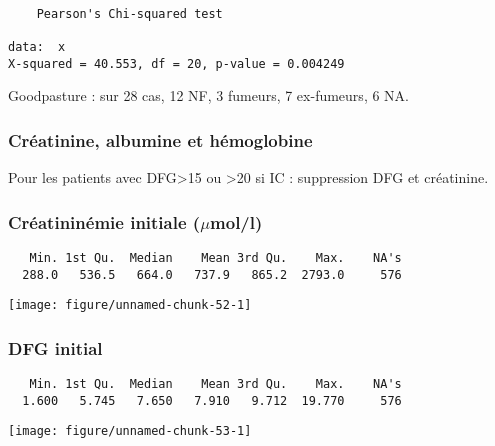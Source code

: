\documentclass[11pt,a4paper]{article}\usepackage[]{graphicx}\usepackage[]{color}
\makeatletter
\def\maxwidth{ %
  \ifdim\Gin@nat@width>\linewidth
    \linewidth
  \else
    \Gin@nat@width
  \fi
}
\newenvironment{kframe}{%
 \def\at@end@of@kframe{}%
 \ifinner\ifhmode%
  \def\at@end@of@kframe{\end{minipage}}%
  \begin{minipage}{\columnwidth}%
 \fi\fi%
 \def\FrameCommand##1{\hskip\@totalleftmargin \hskip-\fboxsep
 \colorbox{shadecolor}{##1}\hskip-\fboxsep
     \hskip-\linewidth \hskip-\@totalleftmargin \hskip\columnwidth}%
 \MakeFramed {\advance\hsize-\width
   \@totalleftmargin\z@ \linewidth\hsize
   \@setminipage}}%
 {\par\unskip\endMakeFramed%
 \at@end@of@kframe}
\newenvironment{knitrout}{}{} %
\makeatother
\begin{document}
\begin{knitrout}
\color{fgcolor}\begin{kframe}
\begin{verbatim}

	Pearson's Chi-squared test

data:  x
X-squared = 40.553, df = 20, p-value = 0.004249
\end{verbatim}
\end{kframe}
\end{knitrout}

Goodpasture : sur 28 cas, 12 NF, 3 fumeurs, 7 ex-fumeurs, 6 NA.


    \subsubsection{Créatinine, albumine et hémoglobine}

Pour les patients avec DFG\textgreater15 ou \textgreater20 si IC : suppression DFG et créatinine.

\subsubsection*{Créatininémie initiale ($\mu$mol/l)}

\begin{knitrout}
\color{fgcolor}\begin{kframe}
\begin{verbatim}
   Min. 1st Qu.  Median    Mean 3rd Qu.    Max.    NA's 
  288.0   536.5   664.0   737.9   865.2  2793.0     576 
\end{verbatim}
\end{kframe}
\texttt{[image: figure/unnamed-chunk-52-1]} 

\end{knitrout}

\subsubsection*{DFG initial}

\begin{knitrout}
\color{fgcolor}\begin{kframe}
\begin{verbatim}
   Min. 1st Qu.  Median    Mean 3rd Qu.    Max.    NA's 
  1.600   5.745   7.650   7.910   9.712  19.770     576 
\end{verbatim}
\end{kframe}
\texttt{[image: figure/unnamed-chunk-53-1]} 

\end{knitrout}
\end{document}
